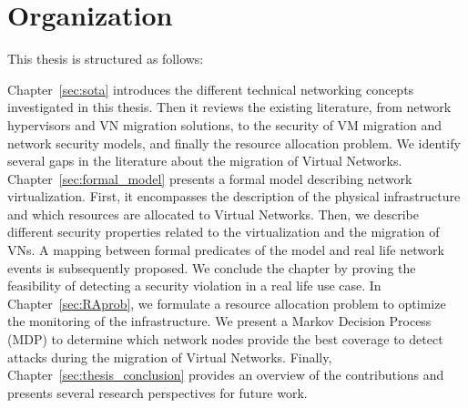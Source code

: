 
\section{Organization}
This thesis is structured as follows: 


Chapter~\ref{sec:sota} introduces the different technical networking concepts investigated in this thesis. Then it reviews the existing literature, from network hypervisors and VN migration solutions, to the security of VM migration and network security models, and finally the resource allocation problem. We identify several gaps in the literature about the migration of Virtual Networks.
Chapter~\ref{sec:formal_model} presents a formal model describing network virtualization. 
First, it encompasses the description of the physical infrastructure and which resources are allocated to Virtual Networks. Then, we describe different security properties related to the virtualization and the migration of VNs. A mapping between formal predicates of the model and real life network events is subsequently proposed. We conclude the chapter by proving the feasibility of detecting a security violation in a real life use case.
In Chapter~\ref{sec:RAprob}, we formulate a resource allocation problem to optimize the monitoring of the infrastructure.
We present a Markov Decision Process (MDP) to determine which network nodes provide the best coverage to detect attacks during the migration of Virtual Networks.
Finally, Chapter~\ref{sec:thesis_conclusion} provides an overview of the contributions and presents several research perspectives for future work.
